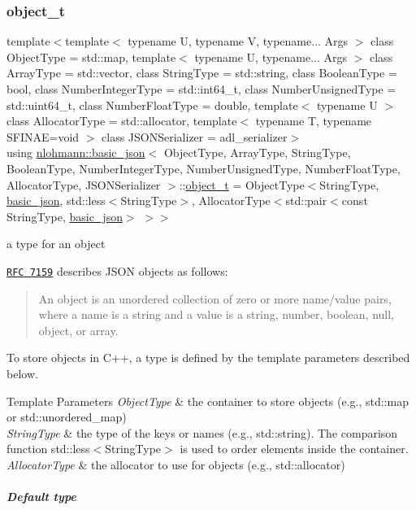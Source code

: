 \subsubsection{\texorpdfstring{object\+\_\+t}{object\_t}}
{\footnotesize\ttfamily template$<$template$<$ typename U, typename V, typename... Args $>$ class Object\+Type = std\+::map, template$<$ typename U, typename... Args $>$ class Array\+Type = std\+::vector, class String\+Type  = std\+::string, class Boolean\+Type  = bool, class Number\+Integer\+Type  = std\+::int64\+\_\+t, class Number\+Unsigned\+Type  = std\+::uint64\+\_\+t, class Number\+Float\+Type  = double, template$<$ typename U $>$ class Allocator\+Type = std\+::allocator, template$<$ typename T, typename S\+F\+I\+N\+A\+E=void $>$ class J\+S\+O\+N\+Serializer = adl\+\_\+serializer$>$ \\
using \mbox{\hyperlink{classnlohmann_1_1basic__json}{nlohmann\+::basic\+\_\+json}}$<$ Object\+Type, Array\+Type, String\+Type, Boolean\+Type, Number\+Integer\+Type, Number\+Unsigned\+Type, Number\+Float\+Type, Allocator\+Type, J\+S\+O\+N\+Serializer $>$\+::\mbox{\hyperlink{classnlohmann_1_1basic__json_aa1eb13d5aa86f80cbee6c58e90fbaf49}{object\+\_\+t}} =  Object\+Type$<$String\+Type, \mbox{\hyperlink{classnlohmann_1_1basic__json}{basic\+\_\+json}}, std\+::less$<$String\+Type$>$, Allocator\+Type$<$std\+::pair$<$const String\+Type, \mbox{\hyperlink{classnlohmann_1_1basic__json}{basic\+\_\+json}}$>$ $>$$>$}



a type for an object 

\href{http://rfc7159.net/rfc7159}{\tt R\+FC 7159} describes J\+S\+ON objects as follows\+: \begin{quote}
An object is an unordered collection of zero or more name/value pairs, where a name is a string and a value is a string, number, boolean, null, object, or array. \end{quote}


To store objects in C++, a type is defined by the template parameters described below.


\begin{DoxyTemplParams}{Template Parameters}
{\em Object\+Type} & the container to store objects (e.\+g., {\ttfamily std\+::map} or {\ttfamily std\+::unordered\+\_\+map}) \\
\hline
{\em String\+Type} & the type of the keys or names (e.\+g., {\ttfamily std\+::string}). The comparison function {\ttfamily std\+::less$<$String\+Type$>$} is used to order elements inside the container. \\
\hline
{\em Allocator\+Type} & the allocator to use for objects (e.\+g., {\ttfamily std\+::allocator})\\
\hline
\end{DoxyTemplParams}
\subparagraph*{Default type}

